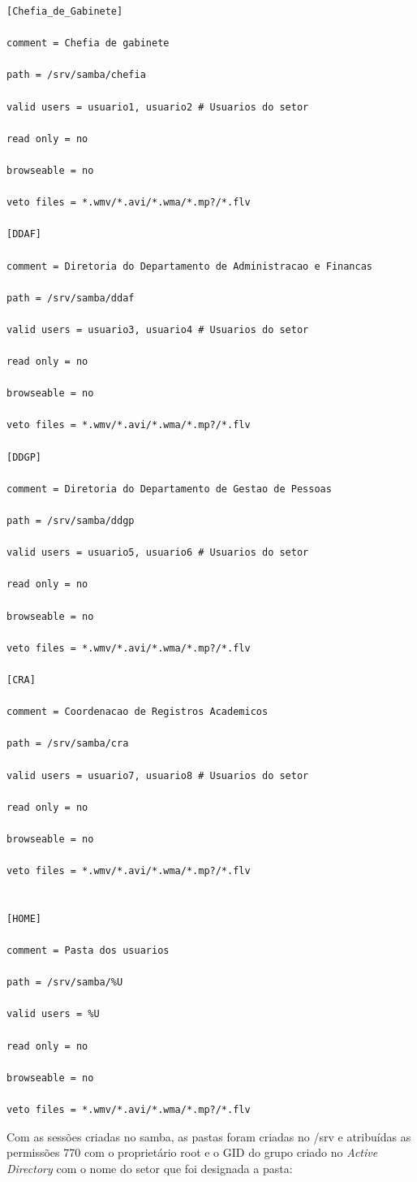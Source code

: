 \begin{lstlisting}
[Chefia_de_Gabinete]

comment = Chefia de gabinete

path = /srv/samba/chefia

valid users = usuario1, usuario2 # Usuarios do setor

read only = no

browseable = no

veto files = *.wmv/*.avi/*.wma/*.mp?/*.flv

[DDAF] 

comment = Diretoria do Departamento de Administracao e Financas

path = /srv/samba/ddaf

valid users = usuario3, usuario4 # Usuarios do setor

read only = no

browseable = no

veto files = *.wmv/*.avi/*.wma/*.mp?/*.flv

[DDGP] 

comment = Diretoria do Departamento de Gestao de Pessoas

path = /srv/samba/ddgp

valid users = usuario5, usuario6 # Usuarios do setor

read only = no

browseable = no

veto files = *.wmv/*.avi/*.wma/*.mp?/*.flv

[CRA] 

comment = Coordenacao de Registros Academicos

path = /srv/samba/cra

valid users = usuario7, usuario8 # Usuarios do setor

read only = no

browseable = no

veto files = *.wmv/*.avi/*.wma/*.mp?/*.flv


[HOME] 

comment = Pasta dos usuarios

path = /srv/samba/%U

valid users = %U

read only = no

browseable = no

veto files = *.wmv/*.avi/*.wma/*.mp?/*.flv
\end{lstlisting}

Com as sessões criadas no samba, as pastas foram criadas no /srv e atribuídas as permissões 770 com o proprietário root e o GID do grupo criado no \textit{Active Directory} com o nome do setor que foi designada a pasta:\\

